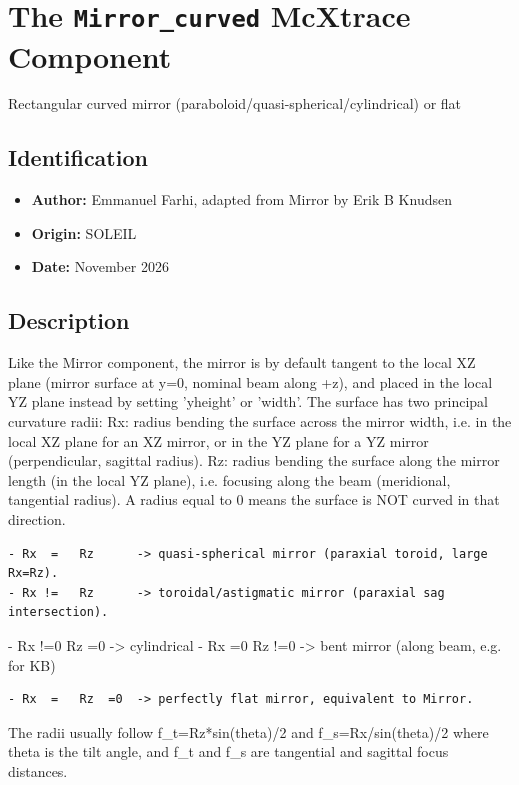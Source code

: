 \section{The \texttt{Mirror\_curved} McXtrace Component}
Rectangular curved mirror (paraboloid/quasi-spherical/cylindrical) or flat

\subsection*{Identification}
\begin{itemize}
  \item \textbf{Author:} Emmanuel Farhi, adapted from Mirror by Erik B Knudsen
  \item \textbf{Origin:} SOLEIL
  \item \textbf{Date:} November 2026
\end{itemize}

\subsection*{Description}
Like the Mirror component, the mirror is by default tangent to the local XZ plane (mirror surface at y=0, nominal beam along +z), and placed in the local YZ plane instead by setting 'yheight' or 'width'. The surface has two principal curvature radii: Rx: radius bending the surface across the mirror width, i.e. in the local XZ plane for an XZ mirror, or in the YZ plane for a YZ mirror (perpendicular, sagittal radius). Rz: radius bending the surface along the mirror length (in the local YZ plane), i.e. focusing along the beam (meridional, tangential radius). A radius equal to 0 means the surface is NOT curved in that direction.

\begin{verbatim}
- Rx  =   Rz      -> quasi-spherical mirror (paraxial toroid, large Rx=Rz).
- Rx !=   Rz      -> toroidal/astigmatic mirror (paraxial sag intersection).
\end{verbatim}

- Rx !=0 Rz =0 -\textgreater{} cylindrical - Rx =0 Rz !=0 -\textgreater{} bent mirror (along beam, e.g. for KB)

\begin{verbatim}
- Rx  =   Rz  =0  -> perfectly flat mirror, equivalent to Mirror.
\end{verbatim}

The radii usually follow f\_t=Rz*sin(theta)/2 and f\_s=Rx/sin(theta)/2 where theta is the tilt angle, and f\_t and f\_s are tangential and sagittal focus distances.

